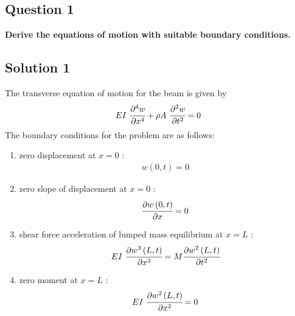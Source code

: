 \documentclass[]{report}
\begin{document}
\subsection*{Question 1}
\textbf{Derive the equations of motion with suitable boundary conditions.}
\begin{center}
\subsection*{Solution 1}
\end{center}
The transverse equation of motion for the beam is given by
\begin{align*}
 EI~\cfrac{\partial^4 w}{\partial x^4} + \rho A~\cfrac{\partial^2 w}{\partial t^2} = 0
\end{align*}
The boundary conditions for the problem are as follows:\\
\begin{enumerate}
\item {zero displacement at $x=0$ :\\ \begin{align*}
w\left(0,t\right)=0
\end{align*} }
\item {zero slope of displacement at $x=0$ :\\ \begin{align*}
\cfrac{\partial w\left(0,t\right)}{\partial x}=0
\end{align*} }
\item {shear force acceleration of lumped mass equilibrium at $x=L$ :\\ \begin{align*}
 EI~\cfrac{\partial w^3\left(L,t\right)}{\partial x^3}=M\cfrac{\partial w^2\left(L,t\right)}{\partial t^2}
\end{align*} }
\item {zero moment at $x=L$ :\\ \begin{align*}
 EI~\cfrac{\partial w^2\left(L,t\right)}{\partial x^2}=0
\end{align*} }
\end{enumerate}
\end{document}
